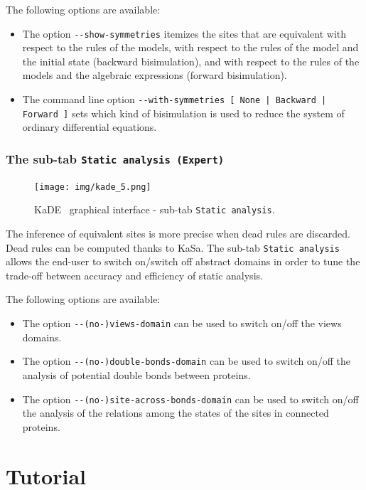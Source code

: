 \documentclass[11pt]{book}
\def\KaSa{\textsf{KaSa}}
\def\KaDE{\textsf{KaDE}}
\begin{document}
The following options are available:
\begin{itemize}
  \item The option \texttt{-{}-show-symmetries} itemizes the sites that are equivalent with respect to the rules of the models, with respect to the rules of the model and the initial state (backward bisimulation), and with respect to the rules of the models and the algebraic expressions (forward bisimulation).
  \item The command line option \texttt{-{}-with-symmetries [ None | Backward | Forward ]} sets which kind of bisimulation is used to reduce the system of ordinary differential equations.
\end{itemize}

\subsubsection{The sub-tab \texttt{Static analysis (Expert)}}

\begin{figure}[htbp]
\centering
\texttt{[image: img/kade\_5.png]}
\caption{\KaDE~ graphical interface - sub-tab \texttt{Static analysis}.}
\label{fig:kade:5}
\end{figure}

The inference of equivalent sites is more precise when dead rules are discarded. Dead rules can be computed thanks to {\KaSa}. The sub-tab \texttt{Static analysis} allows the end-user to switch on/switch off abstract domains in order to tune the trade-off between accuracy and efficiency of  static analysis.

The following options are available:
\begin{itemize}
\item The option \verb?--(no-)views-domain? can be used to switch on/off the views domains.

\item The option \verb?--(no-)double-bonds-domain? can be used to switch on/off the analysis of potential double bonds between proteins.

\item The option \verb?--(no-)site-across-bonds-domain? can be used to switch on/off the analysis of the relations among the states of the sites in connected proteins.
\end{itemize}

\section{Tutorial}
\end{document}
